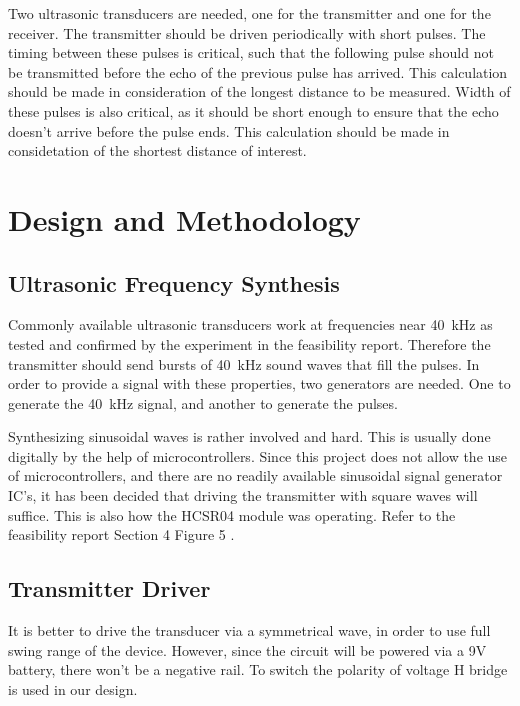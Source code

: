 \documentclass[12pt, a4paper]{article}
\begin{document}
        \bigskip 
        Two ultrasonic transducers are needed, one for the transmitter and one for the receiver. The transmitter should be driven periodically with short pulses. The timing between these pulses is critical, such that the following pulse should not be transmitted before the echo of the previous pulse has arrived. This calculation should be made in consideration of the longest distance to be measured. Width of these pulses is also critical, as it should be short enough to ensure that the echo doesn't arrive before the pulse ends. This calculation should be made in considetation of the shortest distance of interest. 
    

    \pagebreak    
    \section{Design and Methodology}
    	\subsection{Ultrasonic Frequency Synthesis}
	
	    Commonly available ultrasonic transducers work at frequencies near \SI{40}{\kilo\hertz} as tested and confirmed by the experiment in the feasibility report. Therefore the transmitter should send bursts of \SI{40}{\kilo\hertz} sound waves that fill the pulses. In order to provide a signal with these properties, two generators are needed. One to generate the \SI{40}{\kilo\hertz} signal, and another to generate the pulses.
	    
	  \bigskip 
	Synthesizing sinusoidal waves is rather involved and hard. This is usually done digitally by the help of microcontrollers. Since this project does not allow the use of microcontrollers, and there are no readily available sinusoidal signal generator IC’s, it has been decided that driving the transmitter with square waves will suffice. This is also how the HCSR04 module was operating. Refer to the feasibility report Section 4 Figure 5 .
	
	\subsection{Transmitter Driver}
		
	It is better to drive the transducer via a symmetrical wave, in order to use full swing range of the device. However, since the circuit will be powered via a 9V battery, there won’t be a negative rail. To switch the polarity of voltage H bridge is used in our design.
	
\end{document}
